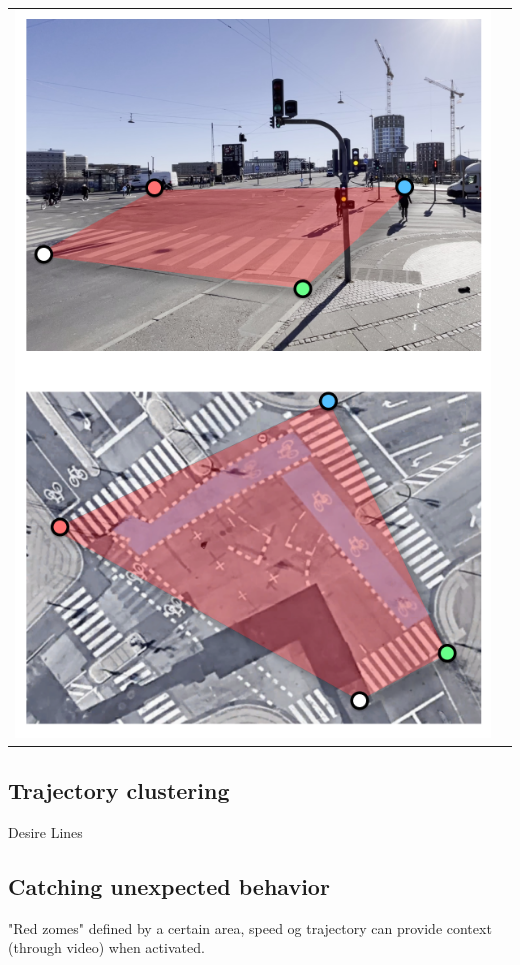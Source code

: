 \documentclass[
10pt, %
a4paper, %
oneside, %
headinclude,footinclude, %
] {book}%
\begin{document}
\raggedbottom
\ \\ 
\noindent
\begin{tabular}{@{}cc}
\includegraphics[width=1.0\columnwidth]{projection_figure} 
\end{tabular}
\label{projection_figure}



\subsection{Trajectory clustering}
Desire Lines

\subsection{Catching unexpected behavior}
"Red zomes" defined by a certain area, speed og trajectory can provide context (through video) when activated. 
\end{document}
